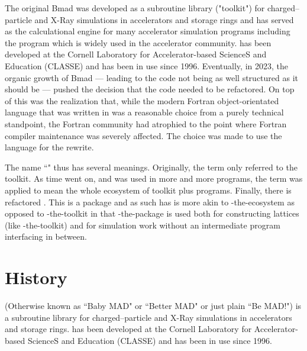 The original Bmad was developed as a subroutine
library ("toolkit") for charged--particle and X-Ray simulations in accelerators and storage rings and 
has served as the calculational engine
for many accelerator simulation programs including the \tao program which is widely used in the
accelerator community. \bmad has
been developed at the Cornell Laboratory for Accelerator-based ScienceS and Education (CLASSE) and
has been in use since 1996.
Eventually, in 2023, the organic growth of Bmad --- leading to the code not being as well structured
as it should be --- pushed the decision that the code needed to be
refactored. On top of this was the realization that, while the modern Fortran object-orientated
language that \bmad was written in was a reasonable choice from a purely technical standpoint, 
the Fortran community had atrophied to the point where Fortran compiler maintenance was severely 
affected. The choice was made to use the \julia language for the rewrite.

The name ``\bmad" thus has several meanings. Originally, the term only referred to the \bmad
toolkit. As time went on, and \bmad was used in more and more programs, the term \bmad was
applied to mean the whole ecosystem of toolkit plus programs. Finally, there is refactored
\bmad. This \bmad is a \julia package and as such has is more akin to \bmad-the-ecosystem as
opposed to \bmad-the-toolkit in that \bmad-the-package is used both for constructing lattices
(like \bmad-the-toolkit) and for simulation work without an intermediate program interfacing in between.

\section{History}

\bmad (Otherwise known as ``Baby MAD" or ``Better MAD" or just plain ``Be MAD!") is a subroutine
library for charged--particle and X-Ray simulations in accelerators and storage rings. \bmad has
been developed at the Cornell Laboratory for Accelerator-based ScienceS and Education (CLASSE) and
has been in use since 1996.

